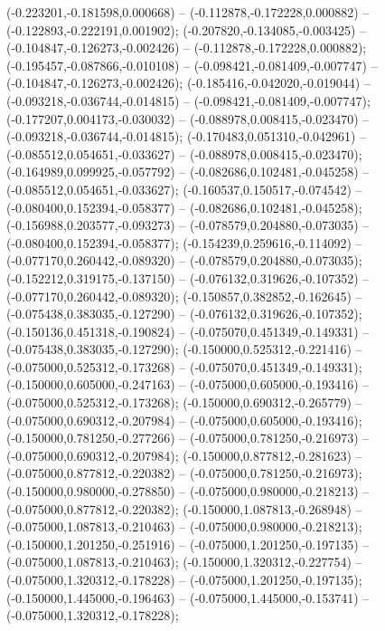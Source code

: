  (-0.223201,-0.181598,0.000668) -- (-0.112878,-0.172228,0.000882) -- (-0.122893,-0.222191,0.001902);
 (-0.207820,-0.134085,-0.003425) -- (-0.104847,-0.126273,-0.002426) -- (-0.112878,-0.172228,0.000882);
 (-0.195457,-0.087866,-0.010108) -- (-0.098421,-0.081409,-0.007747) -- (-0.104847,-0.126273,-0.002426);
 (-0.185416,-0.042020,-0.019044) -- (-0.093218,-0.036744,-0.014815) -- (-0.098421,-0.081409,-0.007747);
 (-0.177207,0.004173,-0.030032) -- (-0.088978,0.008415,-0.023470) -- (-0.093218,-0.036744,-0.014815);
 (-0.170483,0.051310,-0.042961) -- (-0.085512,0.054651,-0.033627) -- (-0.088978,0.008415,-0.023470);
 (-0.164989,0.099925,-0.057792) -- (-0.082686,0.102481,-0.045258) -- (-0.085512,0.054651,-0.033627);
 (-0.160537,0.150517,-0.074542) -- (-0.080400,0.152394,-0.058377) -- (-0.082686,0.102481,-0.045258);
 (-0.156988,0.203577,-0.093273) -- (-0.078579,0.204880,-0.073035) -- (-0.080400,0.152394,-0.058377);
 (-0.154239,0.259616,-0.114092) -- (-0.077170,0.260442,-0.089320) -- (-0.078579,0.204880,-0.073035);
 (-0.152212,0.319175,-0.137150) -- (-0.076132,0.319626,-0.107352) -- (-0.077170,0.260442,-0.089320);
 (-0.150857,0.382852,-0.162645) -- (-0.075438,0.383035,-0.127290) -- (-0.076132,0.319626,-0.107352);
 (-0.150136,0.451318,-0.190824) -- (-0.075070,0.451349,-0.149331) -- (-0.075438,0.383035,-0.127290);
 (-0.150000,0.525312,-0.221416) -- (-0.075000,0.525312,-0.173268) -- (-0.075070,0.451349,-0.149331);
 (-0.150000,0.605000,-0.247163) -- (-0.075000,0.605000,-0.193416) -- (-0.075000,0.525312,-0.173268);
 (-0.150000,0.690312,-0.265779) -- (-0.075000,0.690312,-0.207984) -- (-0.075000,0.605000,-0.193416);
 (-0.150000,0.781250,-0.277266) -- (-0.075000,0.781250,-0.216973) -- (-0.075000,0.690312,-0.207984);
 (-0.150000,0.877812,-0.281623) -- (-0.075000,0.877812,-0.220382) -- (-0.075000,0.781250,-0.216973);
 (-0.150000,0.980000,-0.278850) -- (-0.075000,0.980000,-0.218213) -- (-0.075000,0.877812,-0.220382);
 (-0.150000,1.087813,-0.268948) -- (-0.075000,1.087813,-0.210463) -- (-0.075000,0.980000,-0.218213);
 (-0.150000,1.201250,-0.251916) -- (-0.075000,1.201250,-0.197135) -- (-0.075000,1.087813,-0.210463);
 (-0.150000,1.320312,-0.227754) -- (-0.075000,1.320312,-0.178228) -- (-0.075000,1.201250,-0.197135);
 (-0.150000,1.445000,-0.196463) -- (-0.075000,1.445000,-0.153741) -- (-0.075000,1.320312,-0.178228);
